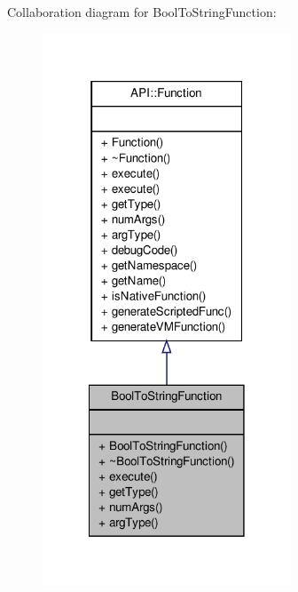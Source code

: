 Collaboration diagram for Bool\-To\-String\-Function\-:
\nopagebreak
\begin{figure}[H]
\begin{center}
\leavevmode
\includegraphics[width=210pt]{class_bool_to_string_function__coll__graph}
\end{center}
\end{figure}
